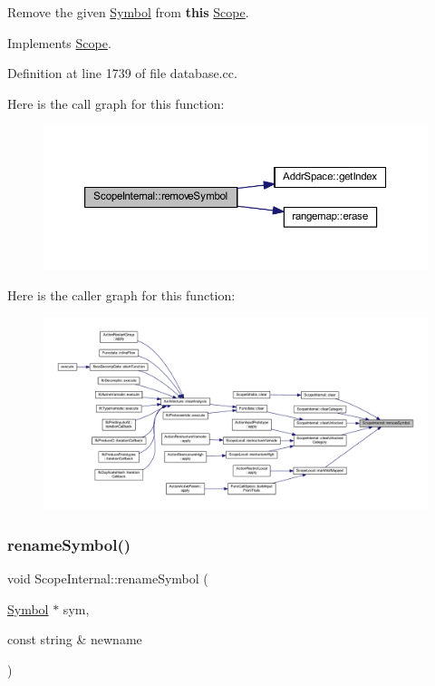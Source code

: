 Remove the given \mbox{\hyperlink{class_symbol}{Symbol}} from {\bfseries{this}} \mbox{\hyperlink{class_scope}{Scope}}. 



Implements \mbox{\hyperlink{class_scope_a0172591847f6a1b338ad324f28732f7f}{Scope}}.



Definition at line 1739 of file database.\+cc.

Here is the call graph for this function\+:
\nopagebreak
\begin{figure}[H]
\begin{center}
\leavevmode
\includegraphics[width=350pt]{class_scope_internal_a77c1ceb048a903b047c1e52108890979_cgraph}
\end{center}
\end{figure}
Here is the caller graph for this function\+:
\nopagebreak
\begin{figure}[H]
\begin{center}
\leavevmode
\includegraphics[width=350pt]{class_scope_internal_a77c1ceb048a903b047c1e52108890979_icgraph}
\end{center}
\end{figure}
\mbox{\label{class_scope_internal_ada63ff8f4efed6fd4605441a0150ae6f}} 
\subsubsection{\texorpdfstring{renameSymbol()}{renameSymbol()}}
{\footnotesize\ttfamily void Scope\+Internal\+::rename\+Symbol (\begin{DoxyParamCaption}\item[{\mbox{\hyperlink{class_symbol}{Symbol}} $\ast$}]{sym,  }\item[{const string \&}]{newname }\end{DoxyParamCaption})\hspace{0.3cm}{\ttfamily [virtual]}}




